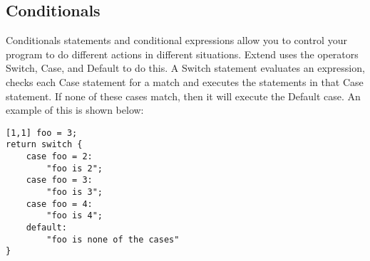 	\subsection{Conditionals}
		Conditionals statements and conditional expressions allow you to control your program to do different actions in different situations. Extend uses the operators Switch, Case, and Default to do this. A Switch statement evaluates an expression, checks each Case statement for a match and executes the statements in that Case statement. If none of these cases match, then it will execute the Default case. An example of this is shown below:
		\begin{lstlisting}
[1,1] foo = 3;
return switch {
	case foo = 2:
		"foo is 2";
	case foo = 3:
		"foo is 3";
	case foo = 4:
		"foo is 4";
	default:
		"foo is none of the cases"
}
		\end{lstlisting}